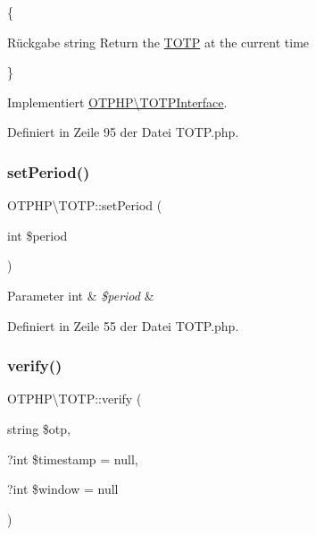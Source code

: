 \{\begin{DoxyReturn}{Rückgabe}
string Return the \mbox{\hyperlink{class_o_t_p_h_p_1_1_t_o_t_p}{T\+O\+TP}} at the current time
\end{DoxyReturn}
\} 

Implementiert \mbox{\hyperlink{interface_o_t_p_h_p_1_1_t_o_t_p_interface_a0501ec004da411bdc5e2c193dffe8191}{O\+T\+P\+H\+P\textbackslash{}\+T\+O\+T\+P\+Interface}}.



Definiert in Zeile 95 der Datei T\+O\+T\+P.\+php.

\mbox{\label{class_o_t_p_h_p_1_1_t_o_t_p_ae0f7a48755d903954a0899a3326dfbf5}} 
\subsubsection{\texorpdfstring{set\+Period()}{setPeriod()}}
{\footnotesize\ttfamily O\+T\+P\+H\+P\textbackslash{}\+T\+O\+T\+P\+::set\+Period (\begin{DoxyParamCaption}\item[{int}]{\$period }\end{DoxyParamCaption})\hspace{0.3cm}{\ttfamily [protected]}}


\begin{DoxyParams}[1]{Parameter}
int & {\em \$period} & \\
\hline
\end{DoxyParams}


Definiert in Zeile 55 der Datei T\+O\+T\+P.\+php.

\mbox{\label{class_o_t_p_h_p_1_1_t_o_t_p_a09c72fb5facb96625474d20540ad7bf0}} 
\subsubsection{\texorpdfstring{verify()}{verify()}}
{\footnotesize\ttfamily O\+T\+P\+H\+P\textbackslash{}\+T\+O\+T\+P\+::verify (\begin{DoxyParamCaption}\item[{string}]{\$otp,  }\item[{?int}]{\$timestamp = {\ttfamily null},  }\item[{?int}]{\$window = {\ttfamily null} }\end{DoxyParamCaption})}

